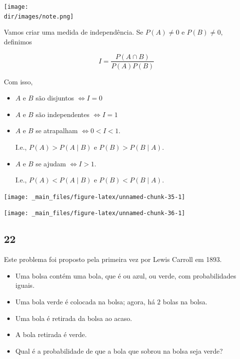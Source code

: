 \documentclass[
  11pt]{report}
\newcommand{\dir}{/ssd/R/x86_64-pc-linux-gnu-library/4.1/fnaufelRmd/rmarkdown/resources}
\newenvironment{rmdnote}
{
  \begin{mynote}
    \texttt{[image: \\dir/images/note.png]}
    \tcblower
  }
  {
  \end{mynote}
}
\begin{document}
\hypertarget{i}{}
\begin{rmdnote}

Vamos criar uma medida de independência. Se $P(A) \neq 0$ e $P(B) \neq 0$, definimos

\[
I = \frac{P(A \cap B)}{P(A)P(B)}
\]

Com isso,

\begin{itemize}
\item
  $A$ e $B$ são disjuntos ${} \iff I = 0$
\item
  $A$ e $B$ são independentes ${} \iff I = 1$
\item
  $A$ e $B$ se atrapalham ${} \iff 0 < I < 1$.

  I.e., $P(A) > P(A \mid B)$ e $P(B) > P(B \mid A)$.
\item
  $A$ e $B$ se ajudam ${} \iff I > 1$.

  I.e., $P(A) < P(A \mid B)$ e $P(B) < P(B \mid A)$.
\end{itemize}

\end{rmdnote}

\begin{center}\texttt{[image: \_main\_files/figure-latex/unnamed-chunk-35-1]} \end{center}

\begin{center}\texttt{[image: \_main\_files/figure-latex/unnamed-chunk-36-1]} \end{center}

\hypertarget{section-15}{%
\subsection*{22}\label{section-15}}

\begin{rmdbox}

Este problema foi proposto pela primeira vez por Lewis Carroll em 1893.

\begin{itemize}
\item
  Uma bolsa contém uma bola, que é ou azul, ou verde, com probabilidades iguais.
\item
  Uma bola verde é colocada na bolsa; agora, há $2$ bolas na bolsa.
\item
  Uma bola é retirada da bolsa ao acaso.
\item
  A bola retirada é verde.
\item
  Qual é a probabilidade de que a bola que sobrou na bolsa seja verde?
\end{itemize}

\end{rmdbox}
\end{document}

